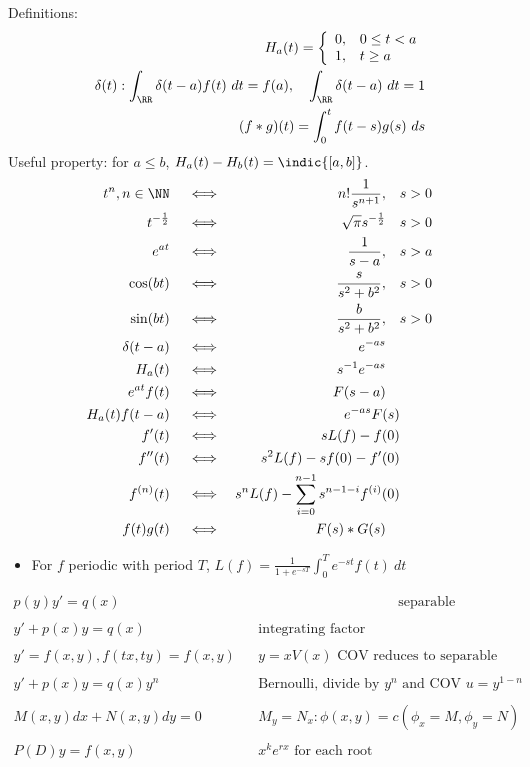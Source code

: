 Definitions:
\begin{align*} H_ { a } ( t ) = \left\{ \begin{array} { l l } { 0 , } & { 0 \leq t < a } \\ { 1 , } & { t \geq a } \end{array} \right.\\
\delta(t): \int_\RR \delta(t-a)f(t)~dt = f(a),\quad \int_\RR \delta(t-a)~dt = 1\\
(f \ast g )(t) = \int_0^t f(t-s)g(s)~ds
\end{align*} Useful property: for \(a\leq b\),
\(H_a(t) - H_b(t) = \indic{[a,b]}\).
\begin{align*}
t^n, n\in\NN \quad&\iff  &n!\frac{1}{s^{n+1}},\quad &s > 0 \\
t^{-\frac{1}{2}} \quad&\iff &\sqrt{\pi} s^{-\frac{1}{2}}\quad & s>0\\
e^{at} \quad&\iff &\frac{1}{s-a},\quad &s > a \\
\cos(bt) \quad&\iff &\frac{s}{s^2+b^2},\quad &s>0 \\
\sin(bt) \quad&\iff &\frac{b}{s^2+b^2},\quad &s>0 \\
\delta(t-a) \quad&\iff &e^{-as} \quad& \\
H_a(t) \quad&\iff &s^{-1}e^{-as}\quad& \\
e^{at}f(t) \quad&\iff &F(s-a)\quad & \\
H_a(t)f(t-a) \quad&\iff &e^{-as}F(s)& \\
f'(t) \quad&\iff & sL(f) - f(0) & \\
f''(t) \quad&\iff &s^2L(f) -sf(0) - f'(0) &\\
f^{(n)}(t) \quad&\iff & s^nL(f) - \sum_{i=0}^{n-1} s^{n-1-i}f^{(i)}(0) & \\
f(t)g(t) \quad&\iff &F(s) \ast G(s)\quad &
\end{align*}

\begin{itemize}
\tightlist
\item
  For \(f\) periodic with period \(T\),
  \(L(f) = \frac{1}{1+e^{-sT}}\int_0^T e^{-st}f(t)~dt\)
\end{itemize}

\begin{align*}
p(y)y' = q(x)                  &  & \hspace{10em} \text{separable} \\ \\
y'+p(x)y = q(x)                &  & \text{integrating factor} \\ \\
y' = f(x,y), f(tx,ty) = f(x,y) &  & y = xV(x)\text{ COV reduces to separable} \\ \\
y' +p(x)y = q(x)y^n            &  & \text{Bernoulli, divide by $y^n$ and COV $u = y^{1-n}$} \\ \\
M(x,y)dx + N(x,y)dy = 0        &  & M_y = N_x: \phi(x,y) = c (\phi_x =M, \phi_y = N) \\ \\
P(D)y = f(x,y)                 &  & x^ke^{rx} \text{ for each root }
\end{align*}

